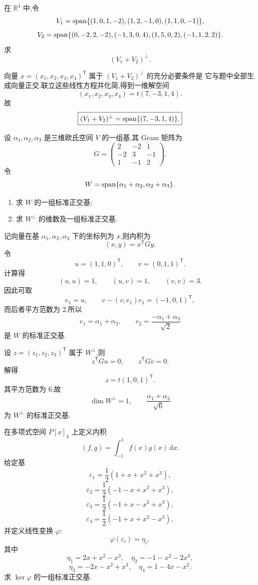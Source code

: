 \begin{example}
在 $\mathbb{R}^4$ 中,令
\[
V_1=\operatorname{span}\{(1,0,1,-2),(1,2,-1,0),(1,1,0,-1)\},
\]
\[
V_2=\operatorname{span}\{(0,-2,2,-2),(-1,3,0,4),(1,5,0,2),(-1,1,2,2)\}.
\]
求
\[
(V_1+V_2)^\perp.
\]
\end{example}
\exampleblank

\begin{solution}
向量 $x=(x_1,x_2,x_3,x_4)^{\mathsf T}$ 属于 $(V_1+V_2)^\perp$ 的充分必要条件是
它与题中全部生成向量正交.联立这些线性方程并化简,得到一维解空间
\[
(x_1,x_2,x_3,x_4)=t(7,-3,1,4).
\]
故
\[
\boxed{(V_1+V_2)^\perp=\operatorname{span}\{(7,-3,1,4)\}.}
\]
\end{solution}


\begin{example}
设 $\alpha_1,\alpha_2,\alpha_3$ 是三维欧氏空间 $V$ 的一组基,其 Gram 矩阵为
\[
G=
\begin{pmatrix}
2&-2&1\\
-2&3&-1\\
1&-1&2
\end{pmatrix}.
\]
令
\[
W=\operatorname{span}\{\alpha_1+\alpha_2,\alpha_2+\alpha_3\}.
\]
\begin{enumerate}
    \item 求 $W$ 的一组标准正交基;
    \item 求 $W^\perp$ 的维数及一组标准正交基.
\end{enumerate}
\end{example}
\exampleblank

\begin{solution}
记向量在基 $\alpha_1,\alpha_2,\alpha_3$ 下的坐标列为 $x$,则内积为
\[
(x,y)=x^{\mathsf T}Gy.
\]
令
\[
u=(1,1,0)^{\mathsf T},
\qquad
v=(0,1,1)^{\mathsf T}.
\]
计算得
\[
(u,u)=1,
\qquad
(u,v)=1,
\qquad
(v,v)=3.
\]
因此可取
\[
e_1=u,
\qquad
v-(v,e_1)e_1=(-1,0,1)^{\mathsf T},
\]
而后者平方范数为 $2$.所以
\[
\boxed{
 e_1=\alpha_1+\alpha_2,
 \qquad
 e_2=\dfrac{-\alpha_1+\alpha_3}{\sqrt2}
}
\]
是 $W$ 的标准正交基.

设 $z=(z_1,z_2,z_3)^{\mathsf T}$ 属于 $W^\perp$,则
\[
z^{\mathsf T}Gu=0,
\qquad
z^{\mathsf T}Gv=0.
\]
解得
\[
z=t(1,0,1)^{\mathsf T}.
\]
其平方范数为 $6$,故
\[
\boxed{
\dim W^\perp=1,
\qquad
\dfrac{\alpha_1+\alpha_3}{\sqrt6}
}
\]
为 $W^\perp$ 的标准正交基.
\end{solution}


\begin{example}
在多项式空间 $P[x]_4$ 上定义内积
\[
(f,g)=\int_{-1}^{1}f(x)g(x)\,\mathrm{d}x.
\]
给定基
\[
\varepsilon_1=\dfrac12(1+x+x^2+x^3),
\]
\[
\varepsilon_2=\dfrac12(-1-x+x^2+x^3),
\]
\[
\varepsilon_3=\dfrac12(-1+x-x^2+x^3),
\]
\[
\varepsilon_4=\dfrac12(-1+x+x^2-x^3),
\]
并定义线性变换 $\varphi$:
\[
\varphi(\varepsilon_i)=\eta_i,
\]
其中
\[
\eta_1=2x+x^2-x^3,
\quad
\eta_2=-1-x^2-2x^3,
\]
\[
\eta_3=-2x-x^2+x^3,
\quad
\eta_4=1-4x-x^2.
\]
求 $\ker\varphi$ 的一组标准正交基.
\end{example}
\exampleblank

